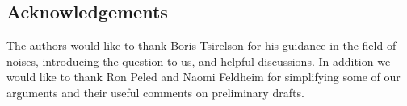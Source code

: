 {
\subsection{Acknowledgements}

The authors would like to thank Boris Tsirelson for his guidance in
the field of noises, introducing the question to us, and helpful
discussions.  In addition we would like to thank Ron Peled and Naomi
Feldheim for simplifying some of our arguments and their useful
comments on preliminary drafts.
}

